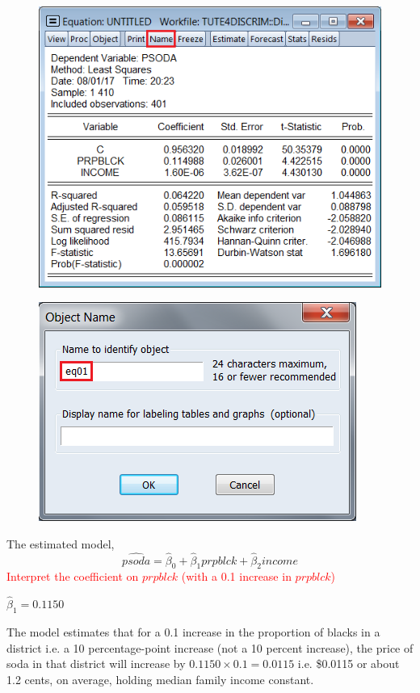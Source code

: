 \documentclass[12pt]{report}
\begin{document}
\begin{figure}[H]
	\centering
	\includegraphics{tute5_13}
\end{figure}
\vspace{-\baselineskip}
\begin{figure}[H]
	\centering
	\includegraphics{tute5_14}
\end{figure}
\vspace{-\baselineskip}

\noindent The estimated model,
$$\widehat{psoda} = \hat{\beta}_0 + \hat{\beta}_1prpblck + \hat{\beta}_2income$$
\noindent \textcolor{red}
{
	Interpret the coefficient on $prpblck$ (with a 0.1 increase in $prpblck$)
}

\noindent $\hat{\beta}_1 = 0.1150$

\noindent The model estimates that for a 0.1 increase in the proportion of blacks in a district i.e. a 10 percentage-point increase (not a 10 percent increase), the price of soda in that district will increase by $0.1150\times0.1=0.0115$ i.e. \$0.0115 or about 1.2 cents, on average, holding median family income constant.
\end{document}
